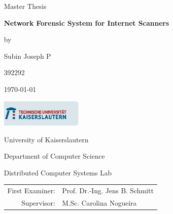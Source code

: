 \thispagestyle{empty}
\enlargethispage{1cm}
\begin{center}
\vfill
{\large Master Thesis}\par
\vfill
\parbox{0.9\textwidth}{
\begin{center}
 \sffamily\bfseries\Huge
 Network Forensic System for Internet Scanners\end{center}
}
\vfill
by\par
\vspace{0.9cm}
{\large Subin Joseph P}\par
392292\par
\vfill
\today\par
\vfill
\includegraphics[width=0.3\textwidth]{images/TU_logo}\par
\vfill
University of Kaiserslautern\par
Department of Computer Science\par
Distributed Computer Systems Lab\par
\vfill
\begin{tabular}{rl}
 First Examiner:  & Prof. Dr.-Ing. Jens B. Schmitt\\
 Supervisor: & M.Sc. Carolina Nogueira 
\end{tabular}
\end{center}